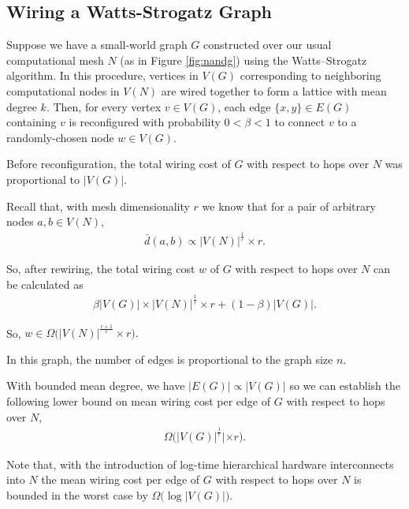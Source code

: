 \subsection{Wiring a Watts-Strogatz Graph} \label{sec:proof4}

Suppose we have a small-world graph $G$ constructed over our usual computational mesh $N$ (as in Figure \ref{fig:nandg}) using the Watts–Strogatz algorithm.
In this procedure, vertices in $V(G)$ corresponding to neighboring computational nodes in $V(N)$ are wired together to form a lattice with mean degree $k$.
Then, for every vertex $v \in V(G)$, each edge $\{x, y\} \in E(G)$ containing $v$ is reconfigured with probability $0 < \beta < 1$ to connect $v$ to a randomly-chosen node $w \in V(G)$.

Before reconfiguration, the total wiring cost of $G$ with respect to hops over $N$ was proportional to $|V(G)|$.

Recall that, with mesh dimensionality $r$ we know that for a pair of arbitrary nodes $a,b \in V(N)$,
\begin{align*}
\bar{d}(a, b) \propto |V(N)|^{\frac{1}{r}} \times r.
\end{align*}

So, after rewiring, the total wiring cost $w$ of $G$ with respect to hops over $N$ can be calculated as
\begin{align*}
  \beta |V(G)| \times |V(N)|^{\frac{1}{r}} \times r + (1 - \beta) |V(G)|.
\end{align*}

So, $w \in \Omega \Big( |V(N)|^{\frac{r+1}{r}} \times r \Big).$

In this graph, the number of edges is proportional to the graph size $n$.

With bounded mean degree, we have $|E(G)| \propto |V(G)|$ so we can establish the following lower bound on mean wiring cost per edge of $G$ with respect to hops over $N$,
\begin{align*}
\Omega \Big( |V(G)|^{\frac{1}{r}}| \times r \Big).
\end{align*}

Note that, with the introduction of log-time hierarchical hardware interconnects into $N$ the mean wiring cost per edge of $G$ with respect to hops over $N$ is bounded in the worst case by $\Omega \Big( \log |V(G)| \Big)$.
